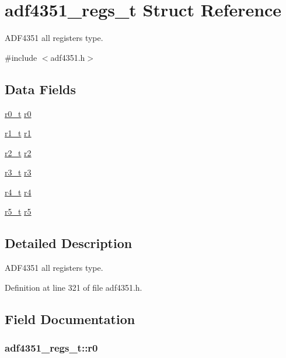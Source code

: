 \hypertarget{structadf4351__regs__t}{}\section{adf4351\+\_\+regs\+\_\+t Struct Reference}
\label{structadf4351__regs__t}


A\+D\+F4351 all registers type.  




{\ttfamily \#include $<$adf4351.\+h$>$}

\subsection*{Data Fields}
\begin{DoxyCompactItemize}
\item 
\hyperlink{structr0__t}{r0\+\_\+t} \hyperlink{structadf4351__regs__t_af58eb2d998c67713353ba39c89c9b4b2}{r0}
\item 
\hyperlink{structr1__t}{r1\+\_\+t} \hyperlink{structadf4351__regs__t_a9e35aa252797cdae6d46ae0daad2bc40}{r1}
\item 
\hyperlink{structr2__t}{r2\+\_\+t} \hyperlink{structadf4351__regs__t_af6667dbbd7434e0394cc9f569d3e24bb}{r2}
\item 
\hyperlink{structr3__t}{r3\+\_\+t} \hyperlink{structadf4351__regs__t_a1aa968491b1182f3ae4f426ef5c1b83a}{r3}
\item 
\hyperlink{structr4__t}{r4\+\_\+t} \hyperlink{structadf4351__regs__t_a343af9ab05747dd9b977603d02ebb4df}{r4}
\item 
\hyperlink{structr5__t}{r5\+\_\+t} \hyperlink{structadf4351__regs__t_ab0bd52a2f47aa3f45d0aa97136ec6e8c}{r5}
\end{DoxyCompactItemize}


\subsection{Detailed Description}
A\+D\+F4351 all registers type. 

Definition at line 321 of file adf4351.\+h.



\subsection{Field Documentation}
\subsubsection[{\texorpdfstring{r0}{r0}}]{ adf4351\+\_\+regs\+\_\+t\+::r0}\hypertarget{structadf4351__regs__t_af58eb2d998c67713353ba39c89c9b4b2}{}\label{structadf4351__regs__t_af58eb2d998c67713353ba39c89c9b4b2}


